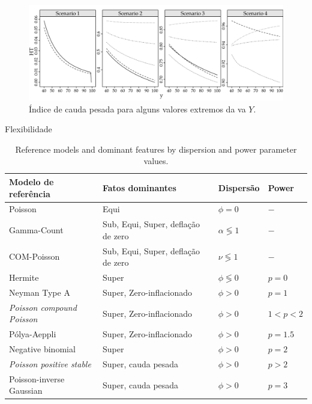 \documentclass[10pt, aspectratio=169]{beamer}\usepackage[]{graphicx}\usepackage[]{color}
\begin{document}

\begin{frame}[fragile]
\begin{figure}[h]
\includegraphics[scale=0.6]{images/heavytail-1.png}
\caption{Índice de cauda pesada para alguns valores extremos da va $Y$.}
\label{Fig3}
\centering
\end{figure}
\end{frame}


\begin{frame}[fragile]{Flexibilidade}
\begin{table}[h]
\centering
\caption{Reference models and dominant features by dispersion and power parameter values.}
\label{tab:model}
\begin{tabular}{llll} \hline
Modelo de referência     & Fatos dominantes                     & Dispersão           & Power   \\ \hline
Poisson                  & Equi                                 & $\phi = 0$          & $-$      \\
Gamma-Count              & Sub, Equi, Super, deflação de zero   & $\alpha \lessgtr 1$ & $-$ \\
COM-Poisson              & Sub, Equi, Super, deflação de zero   & $\nu \lessgtr 1$    & $-$ \\
Hermite                  & Super                                & $\phi\lessgtr 0$    & $p = 0$   \\
Neyman Type A            & Super, Zero-inflacionado             & $\phi > 0$          & $p = 1$ \\
\textit{Poisson compound Poisson} & Super, Zero-inflacionado    & $\phi > 0$ & $1 < p < 2$ \\
P\'olya-Aeppli           & Super, Zero-inflacionado             & $\phi > 0$ & $p = 1.5$ \\
Negative binomial        & Super                                & $\phi > 0$ & $p = 2$ \\
\textit{Poisson positive stable}  & Super, cauda pesada         & $\phi > 0$       & $p > 2$ \\
Poisson-inverse Gaussian & Super, cauda pesada                     & $\phi > 0$       & $p = 3$ \\ \hline
\end{tabular}
\end{table}


\end{frame}
\end{document}
